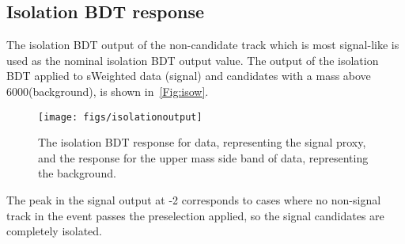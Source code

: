 \subsection{Isolation BDT response}
The isolation BDT output of the non-candidate track which is most signal-like is used as the nominal isolation BDT output value. The output of the isolation BDT applied to sWeighted \LbKjpsi data (signal) and \Lbpi candidates with a mass above 6000\mevcc (background), is shown in~\autoref{Fig:isow}.
\begin{figure}[ht!]
    \centering
  \texttt{[image: figs/isolationoutput]}
  \caption{The isolation BDT response for \LbKjpsi data, representing the signal proxy, and the response for the upper mass side band of \Lbpi data, representing the background.}
    \label{Fig:isow}
\end{figure}
The peak in the signal output at -2 corresponds to cases where no non-signal track in the event passes the preselection applied, so the signal candidates are completely isolated. %
